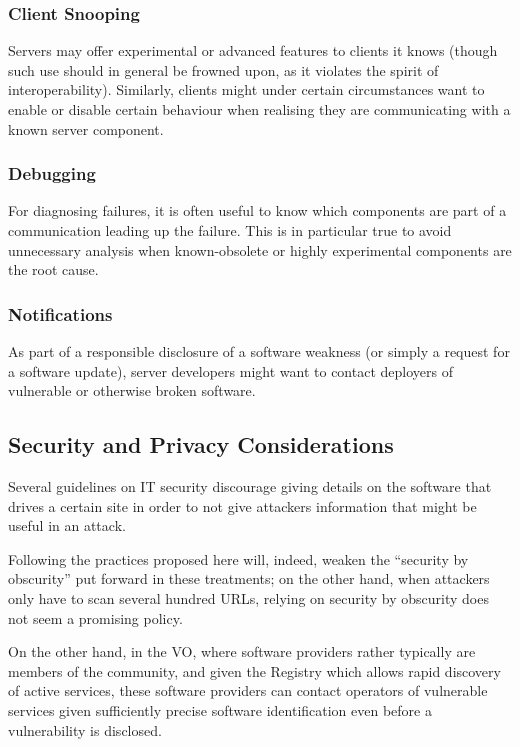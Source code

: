 \documentclass[11pt,a4paper]{ivoa}
\begin{document}
\subsubsection{Client Snooping}

Servers may offer experimental or advanced features to clients it knows
(though such use should in general be frowned upon, as it violates the
spirit of interoperability).  Similarly, clients might under certain
circumstances want to enable or disable certain behaviour when realising
they are communicating with a known server component.

\subsubsection{Debugging}

For diagnosing failures, it is often useful to know which components are
part of a communication leading up the failure.  This is in particular
true to avoid unnecessary analysis when known-obsolete or highly
experimental components are the root cause.

\subsubsection{Notifications}

As part of a responsible disclosure of a software weakness (or simply a
request for a software update), server developers might want to contact
deployers of vulnerable or otherwise broken software.

\subsection{Security and Privacy Considerations}

Several guidelines on IT security discourage giving details on the
software that drives a certain site in order to not give attackers
information that might be useful in an attack.

Following the practices proposed here will, indeed, weaken the
``security by obscurity'' put forward in these treatments; on the other
hand, when attackers only have to scan several hundred URLs,
relying on security by obscurity does not seem a promising policy.

On the other
hand, in the VO, where software providers rather typically are members
of the community, and given the Registry which allows rapid discovery of
active services, these software providers can contact
operators of vulnerable services given sufficiently precise software
identification even before a vulnerability is disclosed.
\end{document}

